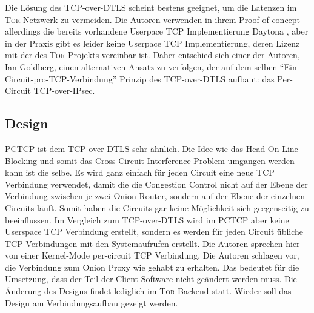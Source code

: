 \documentclass[fleqn,envcountsame,runningheads,10pt,a4paper]{llncs}
\begin{document}
Die Lösung des TCP-over-DTLS scheint bestens geeignet, um die Latenzen im \textsc{Tor}-Netzwerk zu vermeiden. Die Autoren verwenden in ihrem Proof-of-concept allerdings die bereits vorhandene Userpace TCP Implementierung Daytona \cite{daytona}, aber in der Praxis gibt es leider keine Userpace TCP  Implementierung, deren Lizenz mit der des \textsc{Tor}-Projekts vereinbar ist. Daher entschied sich einer der Autoren, Ian Goldberg, einen alternativen Ansatz zu verfolgen, der auf dem selben ``Ein-Circuit-pro-TCP-Verbindung'' Prinzip des  TCP-over-DTLS aufbaut: das Per-Circuit TCP-over-IPsec. 

\begin{figure}[h]
\end{figure} 

\subsection{Design}

PCTCP ist dem TCP-over-DTLS sehr ähnlich. Die Idee wie das Head-On-Line Blocking und somit das Cross Circuit Interference Problem umgangen werden kann ist die selbe. Es wird ganz einfach für jeden Circuit eine neue TCP Verbindung verwendet, damit die die Congestion Control nicht auf der Ebene der Verbindung zwischen je zwei Onion Router, sondern auf der Ebene der einzelnen Circuits läuft. Somit haben die Circuits gar keine Möglichkeit sich geegenseitig zu beeinflussen. Im Vergleich zum TCP-over-DTLS wird im PCTCP aber keine Userspace TCP Verbindung erstellt, sondern es werden für jeden Circuit übliche TCP Verbindungen mit den Systemaufrufen erstellt. Die Autoren sprechen hier von einer Kernel-Mode per-circuit TCP Verbindung. 
Die Autoren schlagen vor, die Verbindung zum Onion Proxy wie gehabt zu erhalten. Das bedeutet für die Umsetzung, dass der Teil der Client Software nicht geändert werden muss. Die Änderung des Designs findet lediglich im \textsc{Tor}-Backend statt. Wieder soll das Design am Verbindungsaufbau gezeigt werden.
\end{document}
